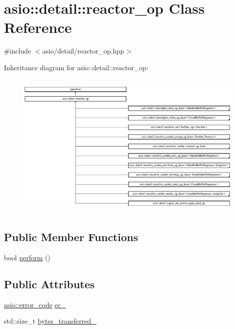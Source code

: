 \hypertarget{classasio_1_1detail_1_1reactor__op}{}\section{asio\+:\+:detail\+:\+:reactor\+\_\+op Class Reference}
\label{classasio_1_1detail_1_1reactor__op}


{\ttfamily \#include $<$asio/detail/reactor\+\_\+op.\+hpp$>$}

Inheritance diagram for asio\+:\+:detail\+:\+:reactor\+\_\+op\+:\begin{figure}[H]
\begin{center}
\leavevmode
\includegraphics[height=7.207921cm]{classasio_1_1detail_1_1reactor__op}
\end{center}
\end{figure}
\subsection*{Public Member Functions}
\begin{DoxyCompactItemize}
\item 
bool \hyperlink{classasio_1_1detail_1_1reactor__op_af603492bc02c6a898a13af121542f74d}{perform} ()
\end{DoxyCompactItemize}
\subsection*{Public Attributes}
\begin{DoxyCompactItemize}
\item 
\hyperlink{classasio_1_1error__code}{asio\+::error\+\_\+code} \hyperlink{classasio_1_1detail_1_1reactor__op_a1d4d635e42b05dd18f11b17c99ec7ed4}{ec\+\_\+}
\item 
std\+::size\+\_\+t \hyperlink{classasio_1_1detail_1_1reactor__op_a721fcf0d5ad569136e6f7a384b1311fc}{bytes\+\_\+transferred\+\_\+}
\end{DoxyCompactItemize}

